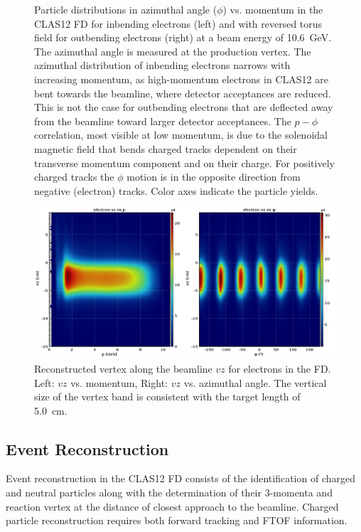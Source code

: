 \documentclass[final,3p]{elsarticle}
\begin{document}
\begin{twocolumn}
\begin{figure}[h!]
\caption{Particle distributions in azimuthal angle ($\phi$) vs. momentum in the CLAS12 FD for inbending electrons
  (left) and with reversed torus field for outbending electrons (right) at a beam energy of 10.6~GeV. The azimuthal
  angle is measured at the production vertex. The azimuthal distribution of inbending electrons narrows with increasing
  momentum, as high-momentum electrons in CLAS12 are bent towards the beamline, where detector acceptances are
  reduced. This is not the case for outbending electrons that are deflected away from the beamline toward larger
  detector acceptances. The $p-\phi$ correlation, most visible at low momentum, is due to the solenoidal magnetic field
  that bends charged tracks dependent on their transverse momentum component and on their charge. For positively
  charged tracks the $\phi$ motion is in the opposite direction from negative (electron) tracks. Color axes indicate the
  particle yields.} 
\label{neg-pos}
\end{figure}
\begin{figure}[t!]
\centerline{\includegraphics[width=1.8\columnwidth]{e_vz.png}}
\caption{Reconstructed vertex along the beamline $vz$ for electrons in the FD. Left: $vz$ vs. momentum, Right: $vz$
  vs. azimuthal angle. The vertical size of the vertex band is consistent with the target length of 5.0~cm.} 
\label{vertex}
\end{figure}

\subsection{Event Reconstruction} 

Event reconstruction in the CLAS12 FD consists of the identification of charged and neutral particles along with the 
determination of their 3-momenta and reaction vertex at the distance of closest approach to the beamline. Charged
particle reconstruction requires both forward tracking and FTOF information. 


\end{twocolumn}
\end{document}
